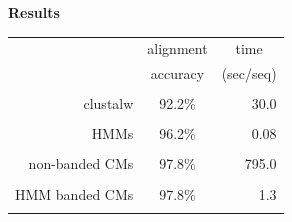 \documentclass[landscape]{slides}
\begin{document}
\begin{slide}
\begin{center}
\large
\textbf{Results}
\end{center}
\medskip
\medskip
\begin{center}

\begin{tabular}{rcr} 
& \multicolumn{1}{c}{alignment} & \multicolumn{1}{c}{time} \\
& \multicolumn{1}{c}{accuracy} & \multicolumn{1}{c}{(sec/seq)} \\ \hline
& \multicolumn{1}{c}{} & \multicolumn{1}{c}{} \\
clustalw & 92.2\% & 30.0 \\ 
& \multicolumn{1}{c}{} & \multicolumn{1}{c}{} \\
HMMs & 96.2\% & 0.08 \\ 
& \multicolumn{1}{c}{} & \multicolumn{1}{c}{} \\
non-banded CMs & 97.8\% & 795.0 \\ 
& \multicolumn{1}{c}{} & \multicolumn{1}{c}{} \\
HMM banded CMs & 97.8\% & 1.3 \\ %
& \multicolumn{1}{c}{} & \multicolumn{1}{c}{} \\
\end{tabular}
\end{center}

\vfill
\end{slide}
\end{document}
